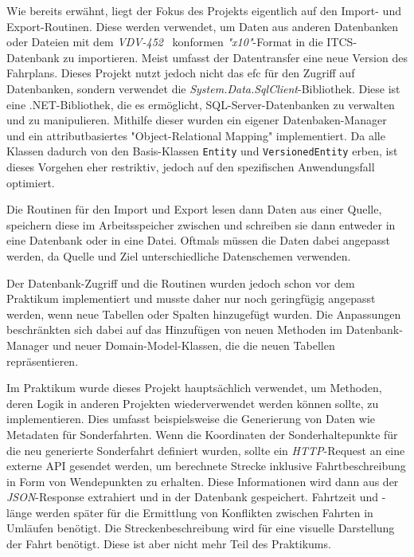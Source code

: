     Wie bereits erwähnt, liegt der Fokus des Projekts eigentlich auf den Import- und Export-Routinen. Diese werden verwendet, um Daten aus anderen Datenbanken oder Dateien mit dem 
    \emph{VDV-452}~\cite{VDV452} konformen \emph{"x10"}-Format in die ITCS-Datenbank zu importieren. Meist umfasst der Datentransfer eine neue Version des Fahrplans.
    Dieses Projekt nutzt jedoch nicht das \gls{efc} für den Zugriff auf Datenbanken, sondern verwendet die \emph{System.Data.SqlClient}-Bibliothek.
    Diese ist eine .NET-Bibliothek, die es ermöglicht, SQL-Server-Datenbanken zu verwalten 
    und zu manipulieren. Mithilfe dieser wurden ein eigener Datenbaken-Manager und ein attributbasiertes "Object-Relational Mapping" implementiert. Da alle Klassen dadurch von den 
    Basis-Klassen \texttt{Entity} und \texttt{VersionedEntity} erben, ist dieses Vorgehen eher restriktiv, jedoch auf den spezifischen Anwendungsfall optimiert.
    
    Die Routinen für den Import und Export lesen dann Daten aus einer Quelle, speichern diese im Arbeitsspeicher zwischen und schreiben sie dann entweder in eine Datenbank oder in eine Datei.
    Oftmals müssen die Daten dabei angepasst werden, da Quelle und Ziel unterschiedliche Datenschemen verwenden. 

    Der Datenbank-Zugriff und die Routinen wurden jedoch schon vor dem Praktikum implementiert und musste daher nur noch geringfügig angepasst werden, wenn neue Tabellen oder Spalten hinzugefügt wurden.
    Die Anpassungen beschränkten sich dabei auf das Hinzufügen von neuen Methoden im Datenbank-Manager und neuer Domain-Model-Klassen, die die neuen Tabellen repräsentieren.
    
    Im Praktikum wurde dieses Projekt hauptsächlich verwendet, um Methoden, deren Logik in anderen Projekten wiederverwendet werden können sollte, zu implementieren. 
    Dies umfasst beispielsweise die Generierung von Daten wie Metadaten für Sonderfahrten. Wenn die Koordinaten der Sonderhaltepunkte für die neu generierte Sonderfahrt definiert wurden,
    sollte ein \emph{HTTP}-Request an eine externe API gesendet werden, um berechnete Strecke inklusive Fahrtbeschreibung in Form von Wendepunkten zu erhalten. Diese 
    Informationen wird dann aus der \emph{JSON}-Response extrahiert und in der Datenbank gespeichert. Fahrtzeit und -länge werden 
    später für die Ermittlung von Konflikten zwischen Fahrten in Umläufen benötigt. Die Streckenbeschreibung wird für eine 
    visuelle Darstellung der Fahrt benötigt. Diese ist aber nicht mehr Teil des Praktikums.
